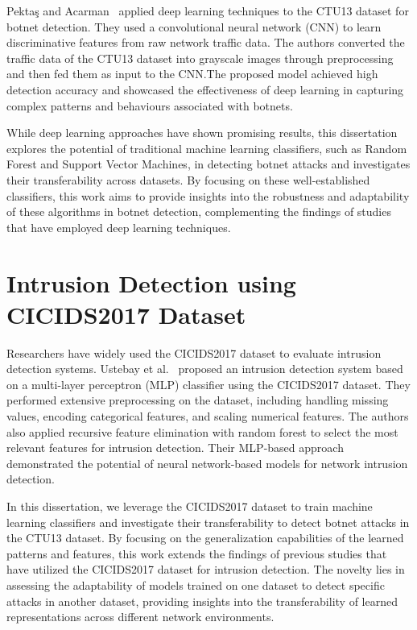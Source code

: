 Pektaş and Acarman~\cite{pektacs2019deep} applied deep learning techniques to the CTU13 dataset for botnet detection. They used a convolutional neural network (CNN) to learn discriminative features from raw network traffic data. The authors converted the traffic data of the CTU13 dataset into grayscale images through preprocessing and then fed them as input to the CNN.\@ The proposed model achieved high detection accuracy and showcased the effectiveness of deep learning in capturing complex patterns and behaviours associated with botnets.

While deep learning approaches have shown promising results, this dissertation explores the potential of traditional machine learning classifiers, such as Random Forest and Support Vector Machines, in detecting botnet attacks and investigates their transferability across datasets. By focusing on these well-established classifiers, this work aims to provide insights into the robustness and adaptability of these algorithms in botnet detection, complementing the findings of studies that have employed deep learning techniques.

\section{Intrusion Detection using CICIDS2017 Dataset}

Researchers have widely used the CICIDS2017 dataset to evaluate intrusion detection systems. Ustebay et al.~\cite{ustebay2018intrusion} proposed an intrusion detection system based on a multi-layer perceptron (MLP) classifier using the CICIDS2017 dataset. They performed extensive preprocessing on the dataset, including handling missing values, encoding categorical features, and scaling numerical features. The authors also applied recursive feature elimination with random forest to select the most relevant features for intrusion detection. Their MLP-based approach demonstrated the potential of neural network-based models for network intrusion detection.

In this dissertation, we leverage the CICIDS2017 dataset to train machine learning classifiers and investigate their transferability to detect botnet attacks in the CTU13 dataset. By focusing on the generalization capabilities of the learned patterns and features, this work extends the findings of previous studies that have utilized the CICIDS2017 dataset for intrusion detection. The novelty lies in assessing the adaptability of models trained on one dataset to detect specific attacks in another dataset, providing insights into the transferability of learned representations across different network environments.

